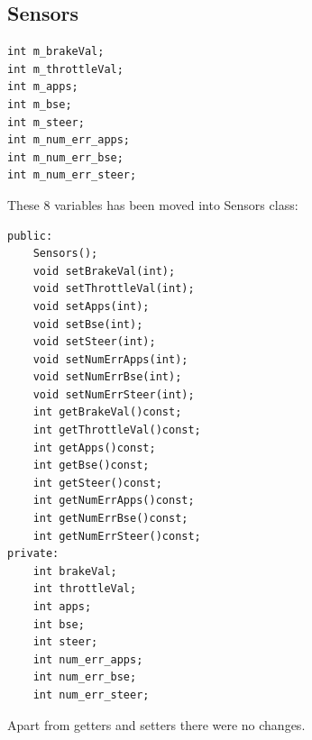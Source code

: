 \documentclass[12pt, letterpaper]{article}
\begin{document}
\subsection{Sensors}
\begin{verbatim}
int m_brakeVal;
int m_throttleVal;
int m_apps;
int m_bse;
int m_steer;
int m_num_err_apps;
int m_num_err_bse;
int m_num_err_steer;
\end{verbatim}
These 8 variables has been moved into Sensors class:
\begin{verbatim}
public:
    Sensors();
    void setBrakeVal(int);
    void setThrottleVal(int);
    void setApps(int);
    void setBse(int);
    void setSteer(int);
    void setNumErrApps(int);
    void setNumErrBse(int);
    void setNumErrSteer(int);
    int getBrakeVal()const;
    int getThrottleVal()const;
    int getApps()const;
    int getBse()const;
    int getSteer()const;
    int getNumErrApps()const;
    int getNumErrBse()const;
    int getNumErrSteer()const;
private:
    int brakeVal;
    int throttleVal;
    int apps;
    int bse;
    int steer;
    int num_err_apps;
    int num_err_bse;
    int num_err_steer;
\end{verbatim}
Apart from getters and setters there were no changes.
\end{document}
